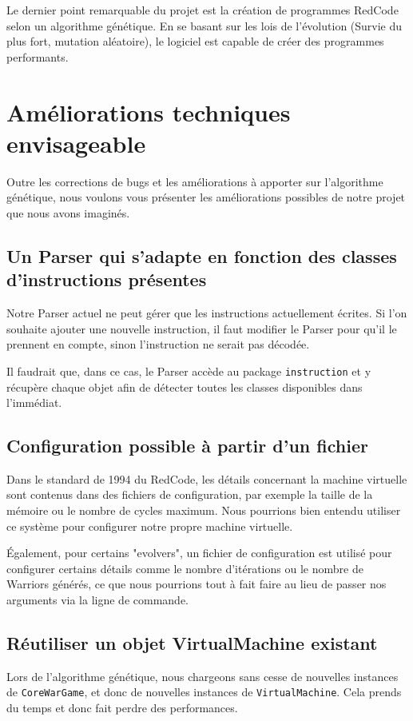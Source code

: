 \documentclass[hidelinks]{report}
\begin{document}
Le dernier point remarquable du projet est la création de programmes RedCode selon un algorithme génétique. En se basant sur les lois de l'évolution (Survie du plus fort, mutation aléatoire), le logiciel est capable de créer des programmes performants.

\section{Améliorations techniques envisageable}
Outre les corrections de bugs et les améliorations à apporter sur l'algorithme génétique, nous voulons vous présenter les améliorations possibles de notre projet que nous avons imaginés.
\subsection{Un Parser qui s'adapte en fonction des classes d'instructions présentes}
Notre Parser actuel ne peut gérer que les instructions actuellement écrites. Si l'on souhaite ajouter une nouvelle instruction, il faut modifier le Parser pour qu'il le prennent en compte, sinon l'instruction ne serait pas décodée.

Il faudrait que, dans ce cas, le Parser accède au package \texttt{instruction} et y récupère chaque objet afin de détecter toutes les classes disponibles dans l'immédiat.
\subsection{Configuration possible à partir d'un fichier}
Dans le standard de 1994\cite{standard94} du RedCode, les détails concernant la machine virtuelle sont contenus dans des fichiers de configuration, par exemple la taille de la mémoire ou le nombre de cycles maximum. Nous pourrions bien entendu utiliser ce système pour configurer notre propre machine virtuelle. 

Également, pour certains "evolvers", un fichier de configuration est utilisé pour configurer certains détails comme le nombre d'itérations ou le nombre de Warriors générés, ce que nous pourrions tout à fait faire au lieu de passer nos arguments via la ligne de commande. 
\subsection{Réutiliser un objet VirtualMachine existant}

Lors de l'algorithme génétique, nous chargeons sans cesse de nouvelles instances de \texttt{CoreWarGame}, et donc de nouvelles instances de \texttt{VirtualMachine}. Cela prends du temps et donc fait perdre des performances. 
\end{document}
